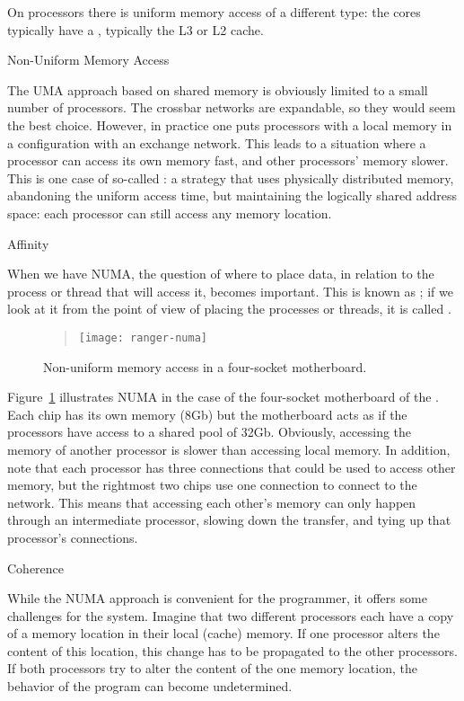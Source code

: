 On  processors there is uniform memory access of
a different type: the cores typically have a
, typically the L3 or L2 cache.

 {Non-Uniform Memory Access}
\label{sec:numa}

The \ac{UMA} approach based on shared memory 
is obviously limited to a small number of
processors. The crossbar networks are expandable, so they would seem 
the best choice. 
However, in practice one puts 
processors with a local memory in a configuration with an exchange
network. This leads to a situation where a processor can access its
own memory fast, and other processors' memory slower.
This is one case of so-called : a strategy that
uses physically distributed memory, abandoning the uniform access
time, but maintaining the logically shared address space: each processor can
still access any memory location.

 {Affinity}

When we have \ac{NUMA}, the question of where to place data,
in relation to the process or thread that will access it,
becomes important. This is known as ;
if we look at it from the point of view of placing the
processes or threads, it is called .

\begin{figure}
  \begin{quote}
  \texttt{[image: ranger-numa]}
  \end{quote}
  \caption{Non-uniform memory access in a four-socket motherboard.}
  \label{fig:ranger-numa}
\end{figure}

Figure~\ref{fig:ranger-numa} illustrates \ac{NUMA} in the case of the
four-socket motherboard of the .
Each chip has its
own memory (8Gb) but the motherboard acts as if the processors have
access to a shared pool of 32Gb. Obviously, accessing the memory of
another processor is slower than accessing local memory. In addition,
note that each processor has three connections that could be used to
access other memory, but the rightmost two chips use one connection to
connect to the network. This means that accessing each other's memory
can only happen through an intermediate processor, slowing down the
transfer, and tying up that processor's connections.

 {Coherence}

While the \ac{NUMA} approach is convenient for the programmer, it offers some
challenges for the system. Imagine that two different processors each
have a copy of a memory location in their local (cache) memory. If one
processor alters the content of this location, this change has to be
propagated to the other processors. If both processors try to alter
the content of the one memory location, the behavior of the program
can become undetermined.

